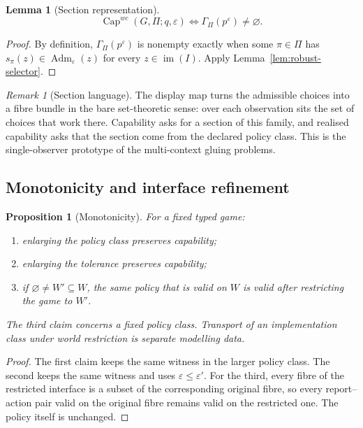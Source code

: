 \documentclass[11pt]{article}
\theoremstyle{plain}
\newtheorem{proposition}[theorem]{Proposition}
\newtheorem{lemma}[theorem]{Lemma}
\theoremstyle{definition}
\theoremstyle{remark}
\newtheorem{remark}[theorem]{Remark}
\newcommand{\im}{\operatorname{im}}
\newcommand{\Capability}{\operatorname{Cap}}
\newcommand{\Adm}{\operatorname{Adm}}
\newcommand{\eps}{\varepsilon}
\begin{document}
\begin{lemma}[Section representation]\label{lem:section-representation}
\[
\Capability^{wc}(G,\Pi;q,\eps)
\iff
\Gamma_\Pi(p^\eps)\ne\varnothing.
\]
\end{lemma}

\begin{proof}
By definition, $\Gamma_\Pi(p^\eps)$ is nonempty exactly when some
$\pi\in\Pi$ has $s_\pi(z)\in\Adm_\eps(z)$ for every $z\in\im(I)$. Apply
Lemma~\ref{lem:robust-selector}.
\end{proof}

\begin{remark}[Section language]
The display map turns the admissible choices into a fibre bundle in the bare
set-theoretic sense: over each observation sits the set of choices that work
there. Capability asks for a section of this family, and realised capability asks
that the section come from the declared policy class. This is the
single-observer prototype of the multi-context gluing problems.
\end{remark}

\subsection{Monotonicity and interface refinement}

\begin{proposition}[Monotonicity]\label{prop:monotone}
For a fixed typed game:
\begin{enumerate}[label=(\roman*)]
\item enlarging the policy class preserves capability;
\item enlarging the tolerance preserves capability;
\item if $\varnothing\ne W'\subseteq W$, the same policy that is valid on $W$
is valid after restricting the game to $W'$.
\end{enumerate}
The third claim concerns a fixed policy class. Transport of an implementation
class under world restriction is separate modelling data.
\end{proposition}

\begin{proof}
The first claim keeps the same witness in the larger policy class. The second
keeps the same witness and uses $\eps\le\eps'$. For the third, every fibre of the
restricted interface is a subset of the corresponding original fibre, so every
report--action pair valid on the original fibre remains valid on the restricted
one. The policy itself is unchanged.
\end{proof}
\end{document}
